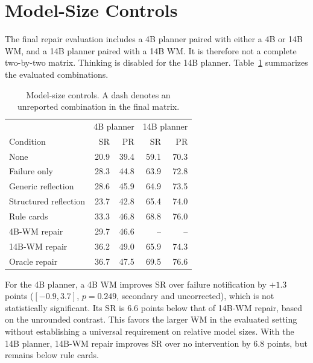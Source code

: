 \section{Model-Size Controls}
The final repair evaluation includes a 4B planner paired with either a 4B or 14B WM, and a 14B planner paired with a 14B WM. It is therefore not a complete two-by-two matrix. Thinking is disabled for the 14B planner. Table~\ref{tab:sizes} summarizes the evaluated combinations.
\begin{table}[h]
\caption{Model-size controls. A dash denotes an unreported combination in the final matrix.}\label{tab:sizes}
\centering\begin{tabular}{lrrrr}\toprule
& \multicolumn{2}{c}{4B planner} & \multicolumn{2}{c}{14B planner}\\
Condition & SR & PR & SR & PR\\\midrule
None & 20.9 & 39.4 & 59.1 & 70.3\\
Failure only & 28.3 & 44.8 & 63.9 & 72.8\\
Generic reflection & 28.6 & 45.9 & 64.9 & 73.5\\
Structured reflection & 23.7 & 42.8 & 65.4 & 74.0\\
Rule cards & 33.3 & 46.8 & 68.8 & 76.0\\
4B-WM repair & 29.7 & 46.6 & -- & --\\
14B-WM repair & 36.2 & 49.0 & 65.9 & 74.3\\
Oracle repair & 36.7 & 47.5 & 69.5 & 76.6\\\bottomrule
\end{tabular}
\end{table}

For the 4B planner, a 4B WM improves SR over failure notification by $+1.3$ points ($[-0.9,3.7]$, $p=0.249$, secondary and uncorrected), which is not statistically significant. Its SR is 6.6 points below that of 14B-WM repair, based on the unrounded contrast. This favors the larger WM in the evaluated setting without establishing a universal requirement on relative model sizes. With the 14B planner, 14B-WM repair improves SR over no intervention by 6.8 points, but remains below rule cards.

